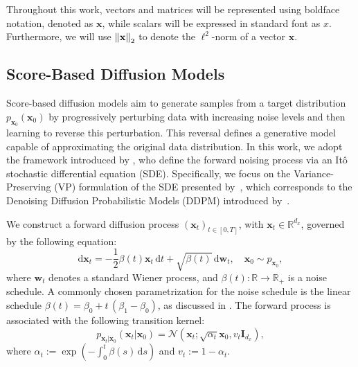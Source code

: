 Throughout this work, vectors and matrices will be represented using boldface notation, denoted as $\mathbf{x}$, while scalars will be expressed in standard font as $x$. Furthermore, we will use $\left\lVert \mathbf{x} \right\rVert_2$ to denote the $\ell^{2}$-norm of a vector $\mathbf{x}$.
\subsection{Score-Based Diffusion Models} 
\label{sec-score-based-diffusions}
Score-based diffusion models aim to generate samples from a target distribution $ p_{\mathbf{x}_0}(\mathbf{x}_0) $ by progressively perturbing data with increasing noise levels and then learning to reverse this perturbation. This reversal defines a generative model capable of approximating the original data distribution. In this work, we adopt the framework introduced by \citet{song2021scorebased}, who define the forward noising process via an Itô stochastic differential equation (SDE). Specifically, we focus on the Variance-Preserving (VP) formulation of the SDE presented by~\citet{song2021scorebased}, which corresponds to the Denoising Diffusion Probabilistic Models (DDPM) introduced by~\citet{ho_denoising}.

We construct a forward diffusion process $ (\mathbf{x}_t)_{t \in [0,T]} $, with $ \mathbf{x}_t \in \mathbb{R}^{d_x} $, governed by the following equation:
\begin{equation*}
\mathrm{d}\mathbf{x}_t = - \frac{1}{2} \beta(t) \mathbf{x}_t \, \mathrm{d}t + \sqrt{\beta(t)} \, \mathrm{d}\mathbf{w}_t, \quad \mathbf{x}_0 \sim p_{\mathbf{x}_0},
\end{equation*}
where $ \mathbf{w}_t $ denotes a standard Wiener process, and $ \beta(t) : \mathbb{R} \to \mathbb{R}_+$ is a noise schedule. A commonly chosen parametrization for the noise schedule is the linear schedule $ \beta(t) = \beta_0 + t \, (\beta_1 - \beta_0) $, as discussed in \citet[Appendix C]{song2021scorebased}. The forward process is associated with the following transition kernel:
\begin{equation}
\label{eq-forward-transition-kernel}
p_{\mathbf{x}_t | \mathbf{x}_0}(\mathbf{x}_t | \mathbf{x}_0) = \mathcal{N}(\mathbf{x}_t; \sqrt{\alpha_t} \mathbf{x}_0, v_t \mathbf{I}_{d_x}),
\end{equation}
where $ \alpha_t := \exp\left( - \int_0^t \beta(s) \, \mathrm{d}s \right) $ and $ v_t := 1 - \alpha_t $. 


